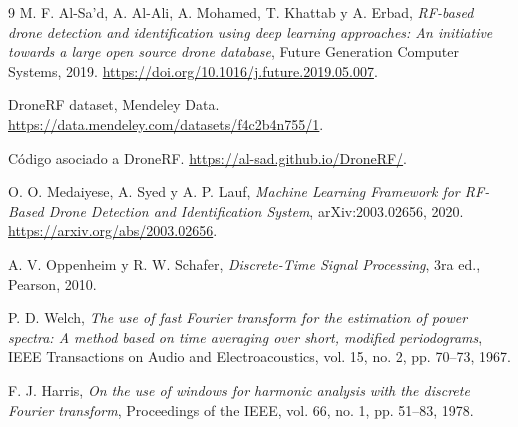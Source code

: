 \documentclass[11pt,a4paper]{article}
\begin{document}
\begin{thebibliography}{9}
M. F. Al-Sa'd, A. Al-Ali, A. Mohamed, T. Khattab y A. Erbad,
\emph{RF-based drone detection and identification using deep learning approaches: An initiative towards a large open source drone database},
Future Generation Computer Systems, 2019.
\url{https://doi.org/10.1016/j.future.2019.05.007}.

DroneRF dataset, Mendeley Data.
\url{https://data.mendeley.com/datasets/f4c2b4n755/1}.

Código asociado a DroneRF.
\url{https://al-sad.github.io/DroneRF/}.

O. O. Medaiyese, A. Syed y A. P. Lauf,
\emph{Machine Learning Framework for RF-Based Drone Detection and Identification System},
arXiv:2003.02656, 2020.
\url{https://arxiv.org/abs/2003.02656}.

A. V. Oppenheim y R. W. Schafer,
\emph{Discrete-Time Signal Processing}, 3ra ed., Pearson, 2010.

P. D. Welch,
\emph{The use of fast Fourier transform for the estimation of power spectra: A method based
on time averaging over short, modified periodograms},
IEEE Transactions on Audio and Electroacoustics, vol. 15, no. 2, pp. 70--73, 1967.

F. J. Harris,
\emph{On the use of windows for harmonic analysis with the discrete Fourier transform},
Proceedings of the IEEE, vol. 66, no. 1, pp. 51--83, 1978.
\end{thebibliography}
\end{document}
